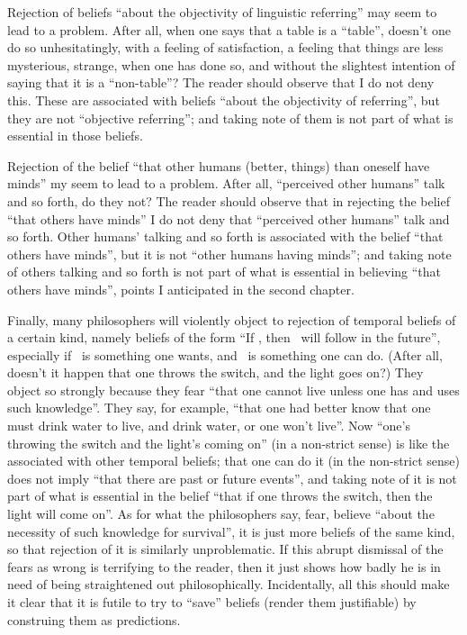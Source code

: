 Rejection of beliefs \enquote{about the objectivity of linguistic referring} may 
seem to lead to a problem. After all, when one says that a table is a \enquote{table}, 
doesn't one do so unhesitatingly, with a feeling of satisfaction, a feeling that 
things are less mysterious, strange, when one has done so, and without the 
slightest intention of saying that it is a \enquote{non-table}? The reader should 
observe that I do not deny this. These  are associated with beliefs 
\enquote{about the objectivity of referring}, but they are not \enquote{objective referring}; 
and taking note of them is not part of what is essential in those beliefs. 

Rejection of the belief \enquote{that other humans (better, things) than oneself 
have minds} my seem to lead to a problem. After all, \enquote{perceived other 
humans} talk and so forth, do they not? The reader should observe that in 
rejecting the belief \enquote{that others have minds} I do not deny that \enquote{perceived 
other humans} talk and so forth. Other humans' talking and so forth is 
associated with the belief \enquote{that others have minds}, but it is not \enquote{other 
humans having minds}; and taking note of others talking and so forth is not 
part of what is essential in believing \enquote{that others have minds}, points I 
anticipated in the second chapter. 

Finally, many philosophers will violently object to rejection of 
temporal beliefs of a certain kind, namely beliefs of the form \enquote{If \x, then \y\ 
will follow in the future}, especially if \y\ is something one wants, and \x\ is 
something one can do. (After all, doesn't it happen that one throws the 
switch, and the light goes on?) They object so strongly because they fear 
\enquote{that one cannot live unless one has and uses such knowledge}. They say, 
for example, \enquote{that one had better know that one must drink water to live, 
and drink water, or one won't live}. Now \enquote{one's throwing the switch and the 
light's coming on} (in a non-strict sense) is like the \term{experiences} associated 
with other temporal beliefs; that one can do it (in the non-strict sense) does 
not imply \enquote{that there are past or future events}, and taking note of it is not 
part of what is essential in the belief \enquote{that if one throws the switch, then the 
light will come on}. As for what the philosophers say, fear, believe \enquote{about 
the necessity of such knowledge for survival}, it is just more beliefs of the 
same kind, so that rejection of it is similarly unproblematic. If this abrupt 
dismissal of the fears as wrong is terrifying to the reader, then it just shows 
how badly he is in need of being straightened out philosophically. 
Incidentally, all this should make it clear that it is futile to try to \enquote{save} 
beliefs (render them justifiable) by construing them as predictions. 


